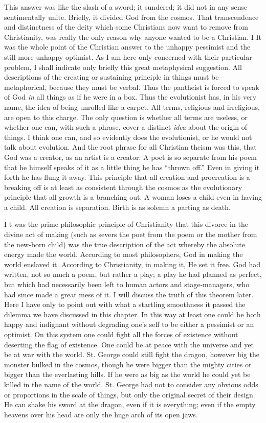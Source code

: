 \documentclass{book}
\begin{document}
This answer was like the slash of a sword; it sundered; it did not in any sense sentimentally unite. Briefly, it divided God from the cosmos. That transcendence and distinctness of the deity which some Christians now want to remove from Christianity, was really the only reason why anyone wanted to be a Christian. I It was the whole point of the Christian answer to the unhappy pessimist and the still more unhappy optimist. As I am here only concerned with their particular problem, I shall indicate only briefly this great metaphysical suggestion. All descriptions of the creating or sustaining principle in things must be metaphorical, because they must be verbal. Thus the pantheist is forced to speak of God \emph{in} all things as if he were in a box. Thus the evolutionist has, in his very name, the idea of being unrolled like a carpet. All terms, religious and irreligious, are open to this charge. The only question is whether all terms are useless, or whether one can, with such a phrase, cover a distinct \emph{idea} about the origin of things. I think one can, and so evidently does the evolutionist, or he would not talk about evolution. And the root phrase for all Christian theism was this, that God was a creator, as an artist is a creator. A poet is so separate from his poem that he himself speaks of it as a little thing he has “thrown off.” Even in giving it forth he has flung it away. This principle that all creation and procreation is a breaking off is at least as consistent through the cosmos as the evolutionary principle that all growth is a branching out. A woman loses a child even in having a child. All creation is separation. Birth is as solemn a parting as death.

I t was the prime philosophic principle of Christianity that this divorce in the divine act of making (such as severs the poet from the poem or the mother from the new-born child) was the true description of the act whereby the absolute energy made the world. According to most philosophers, God in making the world enslaved it. According to Christianity, in making it, He set it free. God had written, not so much a poem, but rather a play; a play he had planned as perfect, but which had necessarily been left to human actors and stage-managers, who had since made a great mess of it. I will discuss the truth of this theorem later. Here I have only to point out with what a startling smoothness it passed the dilemma we have discussed in this chapter. In this way at least one could be both happy and indignant without degrading one’s self to be either a pessimist or an optimist. On this system one could fight all the forces of existence without deserting the flag of existence. One could be at peace with the universe and yet be at war with the world. St. George could still fight the dragon, however big the monster bulked in the cosmos, though he were bigger than the mighty cities or bigger than the everlasting hills. If he were as big as the world he could yet be killed in the name of the world. St. George had not to consider any obvious odds or proportions in the scale of things, but only the original secret of their design. He can shake his sword at the dragon, even if it is everything; even if the empty heavens over his head are only the huge arch of its open jaws.
\end{document}
